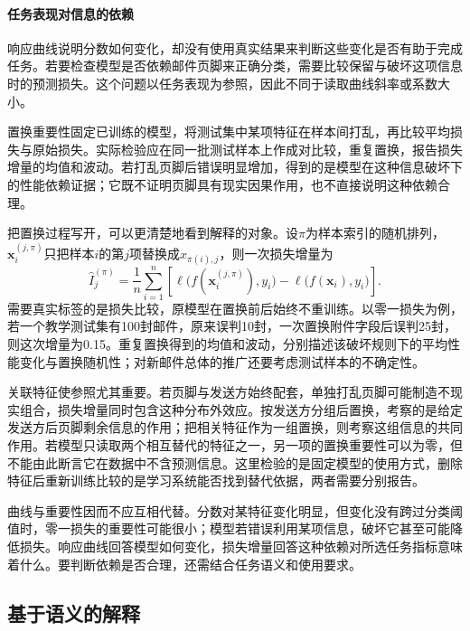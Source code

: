 \paragraph{任务表现对信息的依赖}

响应曲线说明分数如何变化，却没有使用真实结果来判断这些变化是否有助于完成任务。若要检查模型是否依赖邮件页脚来正确分类，需要比较保留与破坏这项信息时的预测损失。这个问题以任务表现为参照，因此不同于读取曲线斜率或系数大小。

置换重要性固定已训练的模型，将测试集中某项特征在样本间打乱，再比较平均损失与原始损失。实际检验应在同一批测试样本上作成对比较，重复置换，报告损失增量的均值和波动。若打乱页脚后错误明显增加，得到的是模型在这种信息破坏下的性能依赖证据；它既不证明页脚具有现实因果作用，也不直接说明这种依赖合理。

把置换过程写开，可以更清楚地看到解释的对象。设$\pi$为样本索引的随机排列，$\bm{x}_i^{(j,\pi)}$只把样本$i$的第$j$项替换成$x_{\pi(i),j}$，则一次损失增量为
\begin{equation}
 \widehat I_j^{(\pi)}
 =\frac1n\sum_{i=1}^n\left[
 \ell\bigl(f(\bm{x}_i^{(j,\pi)}),y_i\bigr)
 -\ell\bigl(f(\bm{x}_i),y_i\bigr)\right].
 \label{eq:interpretability-permutation}
\end{equation}
需要真实标签的是损失比较，原模型在置换前后始终不重训练。以零一损失为例，若一个教学测试集有100封邮件，原来误判10封，一次置换附件字段后误判25封，则这次增量为0.15。重复置换得到的均值和波动，分别描述该破坏规则下的平均性能变化与置换随机性；对新邮件总体的推广还要考虑测试样本的不确定性。

关联特征使参照尤其重要。若页脚与发送方始终配套，单独打乱页脚可能制造不现实组合，损失增量同时包含这种分布外效应。按发送方分组后置换，考察的是给定发送方后页脚剩余信息的作用；把相关特征作为一组置换，则考察这组信息的共同作用。若模型只读取两个相互替代的特征之一，另一项的置换重要性可以为零，但不能由此断言它在数据中不含预测信息。这里检验的是固定模型的使用方式，删除特征后重新训练比较的是学习系统能否找到替代依据，两者需要分别报告。

曲线与重要性因而不应互相代替。分数对某特征变化明显，但变化没有跨过分类阈值时，零一损失的重要性可能很小；模型若错误利用某项信息，破坏它甚至可能降低损失。响应曲线回答模型如何变化，损失增量回答这种依赖对所选任务指标意味着什么。要判断依赖是否合理，还需结合任务语义和使用要求。

\subsection{基于语义的解释}
\label{sec:interpretability-global-concepts}

